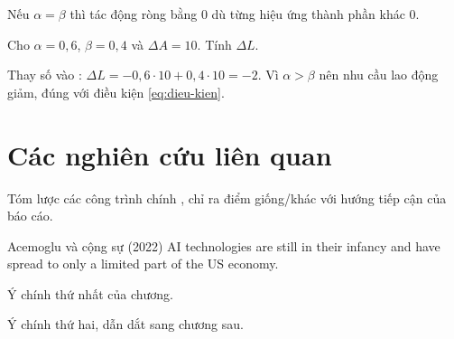 \begin{dinhly}
  Nếu $\alpha = \beta$ thì tác động ròng bằng $0$ dù từng hiệu ứng thành phần khác $0$.
\end{dinhly}

\begin{vidu}
  Cho $\alpha = 0{,}6$, $\beta = 0{,}4$ và $\Delta A = 10$. Tính $\Delta L$.
\end{vidu}
\begin{loigiai}
  Thay số vào :
  $\Delta L = -0{,}6 \cdot 10 + 0{,}4 \cdot 10 = -2$.
  Vì $\alpha > \beta$ nên nhu cầu lao động giảm, đúng với điều kiện \eqref{eq:dieu-kien}.
\end{loigiai}

\section{Các nghiên cứu liên quan}
\label{sec:lien-quan}

Tóm lược các công trình chính \cite{acemoglu2022, brynjolfsson2025, acemoglu2020}, chỉ ra
điểm giống/khác với hướng tiếp cận của báo cáo.

\begin{trichdan}{Acemoglu và cộng sự (2022)}
  AI technologies are still in their infancy and have spread to only a limited part of
  the US economy.
\end{trichdan}

\begin{ychinh}
  \begin{dssao}
    \item Ý chính thứ nhất của chương.
    \item Ý chính thứ hai, dẫn dắt sang chương sau.
  \end{dssao}
\end{ychinh}

